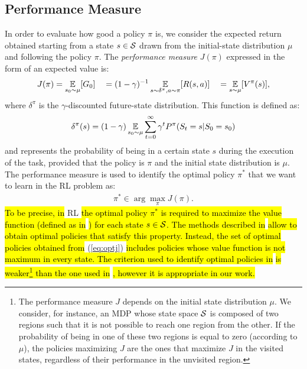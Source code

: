 \subsection{Performance Measure}
In order to evaluate how good a policy $\pi$ is, we consider the expected return obtained starting from a state $s \in \mathcal{S}$ drawn from the initial-state distribution $\mu$ and following the policy $\pi$. The \emph{performance measure} $J(\pi)$ expressed in the form of an expected value is:
\begin{align} J(\pi) = \operatorname*{\mathbb{E}}_{s_0\sim\mu}[G_0] \quad = (1 - \gamma)^{-1}\operatorname*{\mathbb{E}}_{s\sim\delta^{\pi}, a \sim \pi}[R(s,a)] \quad = \operatorname*{\mathbb{E}}_{s\sim\mu}[V^{\pi}(s)], \end{align}
where $\delta^{\pi}$ is the $\gamma$-discounted future-state distribution. This function is defined as:
\begin{align} \delta^{\pi}(s) = (1 - \gamma)\operatorname*{\mathbb{E}}_{s_{0}\sim\mu}\sum_{t=0}^{\infty}\gamma^t P^{\pi}(S_t = s|S_0=s_0) \end{align}
and represents the probability of being in a certain state $s$ during the execution of the task, provided that the policy is $\pi$ and the initial state distribution is $\mu$.\\
\newline
The performance measure is used to identify the optimal policy $\pi^{*}$ that we want to learn in the \ac{RL} problem as:
\begin{align} \pi^{*} \in \arg \max_{\pi} J(\pi). \label{eq:optj}\end{align}
\hl{To be precise, in} \ac{RL} \hl{the optimal policy $\pi^{*}$ is required to maximize the value function (defined as in} \hl{) for each state $s \in \mathcal{S}$. The methods described in}  \hl{allow to obtain optimal policies that satisfy this property. Instead, the set of optimal policies obtained from} (\ref{eq:optj}) \hl{includes policies whose value function is not maximum in every state. The criterion used to identify optimal policies in}  \hl{is weaker\footnote{The performance measure $J$ depends on the initial state distribution $\mu$. We consider, for instance, an \ac{MDP} whose state space $\mathcal{S}$ is composed of two regions such that it is not possible to reach one region from the other. If the probability of being in one of these two regions is equal to zero (according to $\mu$), the policies maximizing $J$ are the ones that maximize $J$ in the visited states, regardless of their performance in the unvisited region.} than the one used in} \hl{, however it is appropriate in our work.}

